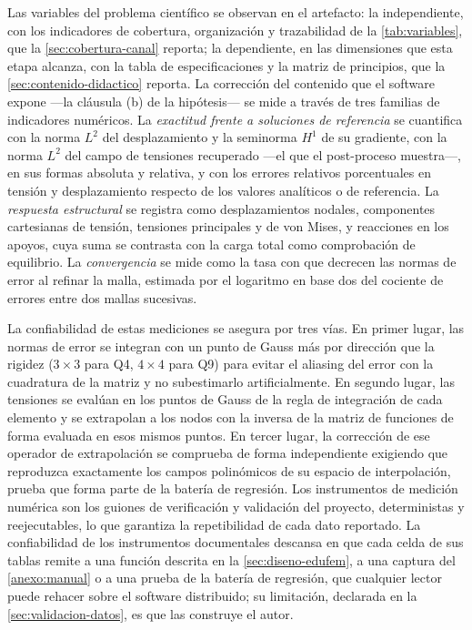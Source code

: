 Las variables del problema científico se observan en el artefacto: la independiente, con los indicadores de cobertura, organización y trazabilidad de la \autoref{tab:variables}, que la \autoref{sec:cobertura-canal} reporta; la dependiente, en las dimensiones que esta etapa alcanza, con la tabla de especificaciones y la matriz de principios, que la \autoref{sec:contenido-didactico} reporta. La corrección del contenido que el software expone —la cláusula (b) de la hipótesis— se mide a través de tres familias de indicadores numéricos. La \emph{exactitud frente a soluciones de referencia} se cuantifica con la norma $L^2$ del desplazamiento y la seminorma $H^1$ de su gradiente, con la norma $L^2$ del campo de tensiones recuperado —el que el post-proceso muestra—, en sus formas absoluta y relativa, y con los errores relativos porcentuales en tensión y desplazamiento respecto de los valores analíticos o de referencia. La \emph{respuesta estructural} se registra como desplazamientos nodales, componentes cartesianas de tensión, tensiones principales y de von Mises, y reacciones en los apoyos, cuya suma se contrasta con la carga total como comprobación de equilibrio. La \emph{convergencia} se mide como la tasa con que decrecen las normas de error al refinar la malla, estimada por el logaritmo en base dos del cociente de errores entre dos mallas sucesivas.

La confiabilidad de estas mediciones se asegura por tres vías. En primer lugar, las normas de error se integran con un punto de Gauss más por dirección que la rigidez ($3\times3$ para Q4, $4\times4$ para Q9) para evitar el aliasing del error con la cuadratura de la matriz y no subestimarlo artificialmente. En segundo lugar, las tensiones se evalúan en los puntos de Gauss de la regla de integración de cada elemento y se extrapolan a los nodos con la inversa de la matriz de funciones de forma evaluada en esos mismos puntos. En tercer lugar, la corrección de ese operador de extrapolación se comprueba de forma independiente exigiendo que reproduzca exactamente los campos polinómicos de su espacio de interpolación, prueba que forma parte de la batería de regresión. Los instrumentos de medición numérica son los guiones de verificación y validación del proyecto, deterministas y reejecutables, lo que garantiza la repetibilidad de cada dato reportado. La confiabilidad de los instrumentos documentales descansa en que cada celda de sus tablas remite a una función descrita en la \autoref{sec:diseno-edufem}, a una captura del \autoref{anexo:manual} o a una prueba de la batería de regresión, que cualquier lector puede rehacer sobre el software distribuido; su limitación, declarada en la \autoref{sec:validacion-datos}, es que las construye el autor.

